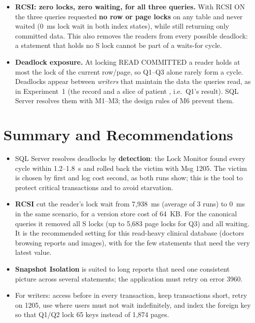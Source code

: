 \begin{itemize}
  \item \textbf{RCSI: zero locks, zero waiting, for all three queries.} With RCSI ON the three queries requested \textbf{no row or page locks} on any table and never waited (0~ms lock wait in both index states), while still returning only committed data. This also removes the readers from every possible deadlock: a statement that holds no S lock cannot be part of a waits-for cycle.

  \item \textbf{Deadlock exposure.} At locking READ COMMITTED a reader holds at most the lock of the current row/page, so Q1--Q3 alone rarely form a cycle. Deadlocks appear between \emph{writers} that maintain the data the queries read, as in Experiment~1 (the record and a slice of patient , i.e.\ Q1's result). SQL Server resolves them with M1--M3; the design rules of M6 prevent them.
\end{itemize}

\section{Summary and Recommendations}
\label{sec:r5-2-summary}

\begin{itemize}
  \item SQL Server resolves deadlocks by \textbf{detection}: the Lock Monitor found every cycle within 1.2--1.8~s and rolled back the victim with Msg 1205. The victim is chosen by  first and log cost second, as both runs show; this is the tool to protect critical transactions and to avoid starvation.
  \item \textbf{RCSI} cut the reader's lock wait from 7{,}938~ms (average of 3 runs) to 0~ms in the same scenario, for a version store cost of 64~KB. For the canonical queries it removed all S locks (up to 5{,}683 page locks for Q3) and all waiting. It is the recommended setting for this read-heavy clinical database (doctors browsing reports and images), with  for the few statements that need the very latest value.
  \item \textbf{Snapshot Isolation} is suited to long reports that need one consistent picture across several statements; the application must retry on error 3960.
  \item For writers: access  before  in every transaction, keep transactions short, retry on 1205, use  where users must not wait indefinitely, and index the foreign key  so that Q1/Q2 lock 65 keys instead of 1{,}874 pages.
\end{itemize}
